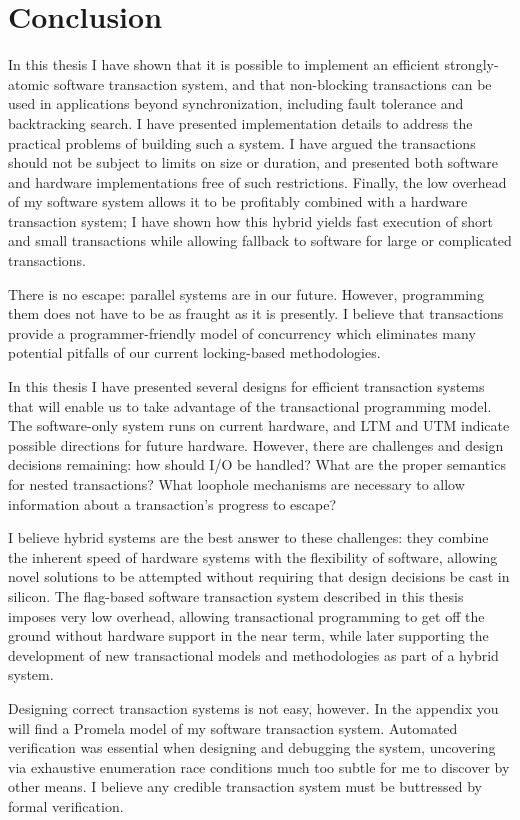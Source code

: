 \chapter{Conclusion}\label{cha:concl}

In this thesis I have shown that it is possible to implement an
efficient strongly-atomic software transaction system, and that
non-blocking transactions can be used in applications beyond
synchronization, including fault tolerance and backtracking search.  I
have presented implementation details to address the practical
problems of building such a system.  I have argued the transactions
should not be subject to limits on size or duration, and presented
both software and hardware implementations free of such restrictions.
Finally, the low overhead of my software system allows it to be
profitably combined with a hardware transaction system; I have shown
how this hybrid yields fast execution of short and small transactions
while allowing fallback to software for large or complicated
transactions.

There is no escape: parallel systems are in our future.  However,
programming them does not have to be as fraught as it is presently.
I believe that transactions provide a programmer-friendly model
of concurrency which eliminates many potential pitfalls of our
current locking-based methodologies.

In this thesis I have presented several designs for efficient
transaction systems that will enable us to take advantage of the
transactional programming model.  The software-only system runs on
current hardware, and LTM and UTM indicate possible directions for future
hardware.  However, there are challenges and design decisions
remaining: how should I/O be handled?  What are the proper semantics
for nested transactions?  What loophole mechanisms are necessary to
allow information about a transaction's progress to escape?

I believe hybrid systems are the best answer to these challenges: they
combine the
inherent speed of hardware systems with the
flexibility of software, allowing novel solutions to be attempted
without requiring that design decisions be cast in silicon.  The
flag-based software transaction system described in this thesis
imposes very low overhead, allowing transactional
programming to get off the ground without hardware support in the near
term, while later supporting the development of new transactional models and
methodologies as part of a hybrid system.

Designing correct transaction systems is not easy, however.  In the
appendix you will find a Promela model of my software transaction
system.  Automated verification was essential when designing and
debugging the system, uncovering via exhaustive enumeration race
conditions much too subtle for me to discover by other means.  I
believe any credible transaction system must be buttressed by formal
verification.
